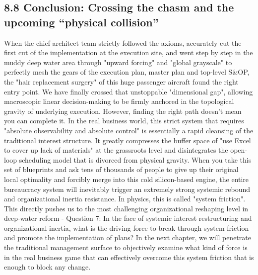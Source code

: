 \documentclass[11pt,a4paper]{article}
\begin{document}
\subsection*{8.8 Conclusion: Crossing the chasm and the upcoming “physical collision”}


When the chief architect team strictly followed the axioms, accurately cut the first cut of the implementation at the execution site, and went step by step in the muddy deep water area through "upward forcing" and "global grayscale" to perfectly mesh the gears of the execution plan, master plan and top-level S\&OP, the "hair replacement surgery" of this huge passenger aircraft found the right entry point. We have finally crossed that unstoppable "dimensional gap", allowing macroscopic linear decision-making to be firmly anchored in the topological gravity of underlying execution. However, finding the right path doesn't mean you can complete it. In the real business world, this strict system that requires "absolute observability and absolute control" is essentially a rapid cleansing of the traditional interest structure. It greatly compresses the buffer space of "use Excel to cover up lack of materials" at the grassroots level and disintegrates the open-loop scheduling model that is divorced from physical gravity. When you take this set of blueprints and ask tens of thousands of people to give up their original local optimality and forcibly merge into this cold silicon-based engine, the entire bureaucracy system will inevitably trigger an extremely strong systemic rebound and organizational inertia resistance. In physics, this is called "system friction". This directly pushes us to the most challenging organizational reshaping level in deep-water reform - Question 7: In the face of systemic interest restructuring and organizational inertia, what is the driving force to break through system friction and promote the implementation of plans? In the next chapter, we will penetrate the traditional management surface to objectively examine what kind of force is in the real business game that can effectively overcome this system friction that is enough to block any change.
\end{document}
